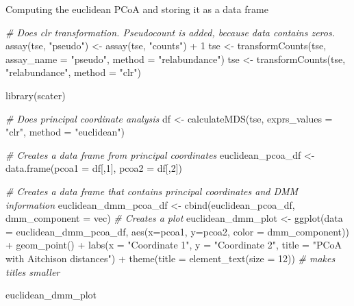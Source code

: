 \documentclass[
]{book}
\newenvironment{Shaded}{\begin{snugshade}}{\end{snugshade}}
\newcommand{\AttributeTok}[1]{\textcolor[rgb]{0.77,0.63,0.00}{#1}}
\newcommand{\CommentTok}[1]{\textcolor[rgb]{0.56,0.35,0.01}{\textit{#1}}}
\newcommand{\DecValTok}[1]{\textcolor[rgb]{0.00,0.00,0.81}{#1}}
\newcommand{\FunctionTok}[1]{\textcolor[rgb]{0.00,0.00,0.00}{#1}}
\newcommand{\NormalTok}[1]{#1}
\newcommand{\OtherTok}[1]{\textcolor[rgb]{0.56,0.35,0.01}{#1}}
\newcommand{\SpecialCharTok}[1]{\textcolor[rgb]{0.00,0.00,0.00}{#1}}
\newcommand{\StringTok}[1]{\textcolor[rgb]{0.31,0.60,0.02}{#1}}
\begin{document}
Computing the euclidean PCoA and storing it as a data frame

\begin{Shaded}
\begin{Highlighting}[]
\CommentTok{\# Does clr transformation. Pseudocount is added, because data contains zeros.}
\FunctionTok{assay}\NormalTok{(tse, }\StringTok{"pseudo"}\NormalTok{) }\OtherTok{\textless{}{-}} \FunctionTok{assay}\NormalTok{(tse, }\StringTok{"counts"}\NormalTok{) }\SpecialCharTok{+} \DecValTok{1}
\NormalTok{tse }\OtherTok{\textless{}{-}} \FunctionTok{transformCounts}\NormalTok{(tse, }\AttributeTok{assay\_name =} \StringTok{"pseudo"}\NormalTok{, }\AttributeTok{method =} \StringTok{"relabundance"}\NormalTok{)}
\NormalTok{tse }\OtherTok{\textless{}{-}} \FunctionTok{transformCounts}\NormalTok{(tse, }\StringTok{"relabundance"}\NormalTok{, }\AttributeTok{method =} \StringTok{"clr"}\NormalTok{)}

\FunctionTok{library}\NormalTok{(scater)}

\CommentTok{\# Does principal coordinate analysis}
\NormalTok{df }\OtherTok{\textless{}{-}} \FunctionTok{calculateMDS}\NormalTok{(tse, }\AttributeTok{exprs\_values =} \StringTok{"clr"}\NormalTok{, }\AttributeTok{method =} \StringTok{"euclidean"}\NormalTok{)}

\CommentTok{\# Creates a data frame from principal coordinates}
\NormalTok{euclidean\_pcoa\_df }\OtherTok{\textless{}{-}} \FunctionTok{data.frame}\NormalTok{(}\AttributeTok{pcoa1 =}\NormalTok{ df[,}\DecValTok{1}\NormalTok{], }
                                \AttributeTok{pcoa2 =}\NormalTok{ df[,}\DecValTok{2}\NormalTok{])}
\end{Highlighting}
\end{Shaded}

\begin{Shaded}
\begin{Highlighting}[]
\CommentTok{\# Creates a data frame that contains principal coordinates and DMM information}
\NormalTok{euclidean\_dmm\_pcoa\_df }\OtherTok{\textless{}{-}} \FunctionTok{cbind}\NormalTok{(euclidean\_pcoa\_df,}
                               \AttributeTok{dmm\_component =}\NormalTok{ vec)}
\CommentTok{\# Creates a plot}
\NormalTok{euclidean\_dmm\_plot }\OtherTok{\textless{}{-}} \FunctionTok{ggplot}\NormalTok{(}\AttributeTok{data =}\NormalTok{ euclidean\_dmm\_pcoa\_df, }
                             \FunctionTok{aes}\NormalTok{(}\AttributeTok{x=}\NormalTok{pcoa1, }\AttributeTok{y=}\NormalTok{pcoa2,}
                                 \AttributeTok{color =}\NormalTok{ dmm\_component)) }\SpecialCharTok{+}
  \FunctionTok{geom\_point}\NormalTok{() }\SpecialCharTok{+}
  \FunctionTok{labs}\NormalTok{(}\AttributeTok{x =} \StringTok{"Coordinate 1"}\NormalTok{,}
       \AttributeTok{y =} \StringTok{"Coordinate 2"}\NormalTok{,}
       \AttributeTok{title =} \StringTok{"PCoA with Aitchison distances"}\NormalTok{) }\SpecialCharTok{+}  
  \FunctionTok{theme}\NormalTok{(}\AttributeTok{title =} \FunctionTok{element\_text}\NormalTok{(}\AttributeTok{size =} \DecValTok{12}\NormalTok{)) }\CommentTok{\# makes titles smaller}

\NormalTok{euclidean\_dmm\_plot}
\end{Highlighting}
\end{Shaded}
\end{document}
